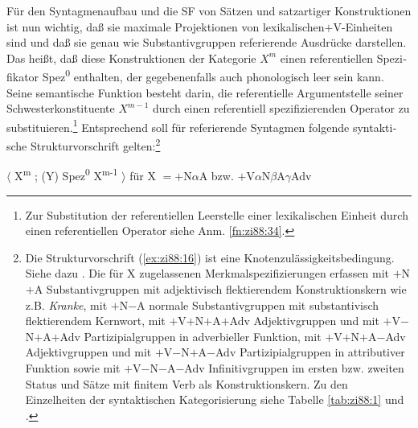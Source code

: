 \documentclass[output=paper,colorlinks,citecolor=brown, booklanguage=german]{langscibook}
\begin{document}
\begin{otherlanguage}{german}
Für den Syntagmenaufbau und die SF von Sätzen und satzartiger Konstruktionen ist nun wichtig, daß sie maximale Projektionen von lexikalischen\linebreak $+$V-Einheiten sind und daß sie genau wie Substantivgruppen referierende Ausdrücke darstellen. Das heißt, daß diese Konstruktionen der Kategorie $X^m$ einen referentiellen Spezifikator Spez\textsuperscript{0} enthalten, der gegebenenfalls auch phonologisch leer sein kann. Seine semantische Funktion besteht darin, die referentielle Argumentstelle seiner Schwesterkonstituente $X^{m-1}$ durch einen referentiell spezifizierenden Operator zu substituieren.\footnote{Zur Substitution der referentiellen Leerstelle einer lexikalischen Einheit durch einen referentiellen Operator siehe Anm. \ref{fn:zi88:34}.} Entsprechend soll für referierende Syntagmen folgende syntaktische Strukturvorschrift gelten:\footnote{Die Strukturvorschrift (\ref{ex:zi88:16}) ist eine Knotenzulässigkeitsbedingung. Siehe dazu \citet{McCawley1968}. Die für X zugelassenen Merkmalspezifizierungen erfassen mit $+$N$+$A Substantivgruppen mit adjektivisch flektierendem Konstruktionskern wie z.B. \textit{Kranke}, mit $+$N$-$A normale Substantivgruppen mit substantivisch flektierendem Kernwort, mit $+$V$+$N$+$A$+$Adv Adjektivgruppen und mit $+$V$-$N$+$A$+$Adv Partizipialgruppen in adverbieller Funktion, mit $+$V$+$N$+$A$-$Adv Adjektivgruppen und mit $+$V$-$N$+$A$-$Adv Partizipialgruppen in attributiver Funktion sowie mit $+$V$-$N$-$A$-$Adv Infinitivgruppen im ersten bzw. zweiten Status und Sätze mit finitem Verb als Konstruktionskern. Zu den Einzelheiten der syntaktischen Kategorisierung siehe Tabelle \ref{tab:zi88:1} und \citet{Zimmermann1988-druck}.}

\ea\label{ex:zi88:16} $\langle$ X\textsuperscript{m} ; (Y) Spez\textsuperscript{0} X\textsuperscript{m-1} $\rangle$ \newline 
für X $= +$N$\alpha$A bzw. $+$V$\alpha$N$\beta$A$\gamma$Adv
\z 
%


\end{otherlanguage}
\end{document}
